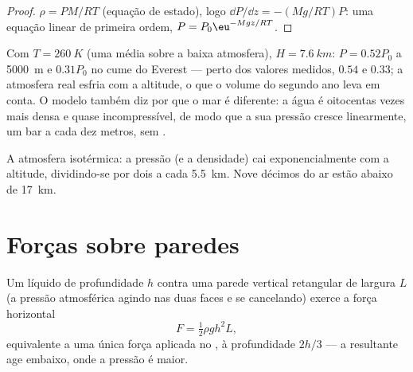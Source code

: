 \begin{proof}
$\rho = PM/RT$ (equação de estado), logo $\dd P/\dd z = -(Mg/RT)P$: uma
equação linear de primeira ordem, $P = P_0\eu^{-Mgz/RT}$.
\end{proof}

\begin{example}[Ar rarefeito]\label{ex:b1:fluid-statics:altitude}
Com $T = \qty{260}{K}$ (uma média sobre a baixa atmosfera), $H =
\qty{7.6}{km}$: $P = 0.52P_0$ a \qty{5000}{m} e $0.31P_0$ no cume do
Everest --- perto dos valores medidos, $0.54$ e $0.33$; a atmosfera real
esfria com a altitude, o que o volume do segundo ano leva em conta. O
modelo também diz por que o mar é diferente: a água é oitocentas vezes mais
densa e quase incompressível, de modo que a sua pressão cresce linearmente,
um bar a cada dez metros, sem .
\end{example}

\begin{omfigure}

{\small A atmosfera isotérmica: a pressão (e a densidade) cai
exponencialmente com a altitude, dividindo-se por dois a cada \qty{5.5}{km}.
Nove décimos do ar estão abaixo de \qty{17}{km}.}
\end{omfigure}

\section{Forças sobre paredes}

\begin{proposition}\label{prop:b1:fluid-statics:wall}
Um líquido de profundidade $h$ contra uma parede vertical retangular de
largura $L$ (a pressão atmosférica agindo nas duas faces e se cancelando)
exerce a força horizontal
\[
F = \tfrac12\rho gh^2L ,
\]
equivalente a uma única força aplicada no \emph{}, à
profundidade $2h/3$ --- a resultante age embaixo, onde a pressão é
maior.
\end{proposition}

